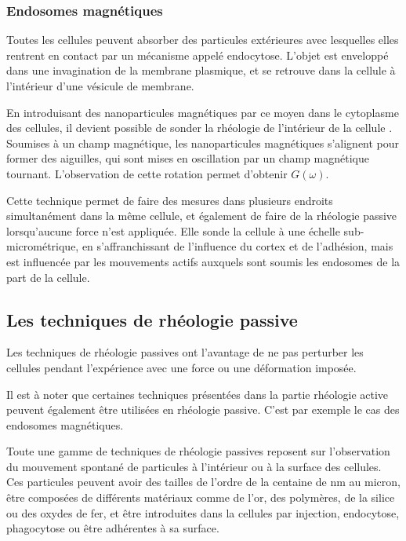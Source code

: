 \subsubsection{Endosomes magnétiques}

Toutes les cellules peuvent absorber des particules extérieures avec lesquelles elles rentrent en contact par un mécanisme appelé endocytose. L'objet est enveloppé dans une invagination de la membrane plasmique, et se retrouve dans la cellule à l'intérieur d'une vésicule de membrane. 

En introduisant des nanoparticules magnétiques par ce moyen dans le cytoplasme des cellules, il devient possible de sonder la rhéologie de l'intérieur de la cellule \parencite{robert_magnetic_2012}. 
Soumises à un champ magnétique, les nanoparticules magnétiques s'alignent pour former des aiguilles, qui sont mises en oscillation par un champ magnétique tournant. 
L'observation de cette rotation permet d'obtenir $G(\omega)$. 

Cette technique permet de faire des mesures dans plusieurs endroits  simultanément dans la même cellule, et également de faire de la rhéologie passive lorsqu'aucune force n'est appliquée. Elle sonde la cellule à une échelle sub-micrométrique, en s'affranchissant de l'influence du cortex et de l'adhésion, mais est influencée par les mouvements actifs auxquels sont soumis les endosomes de la part de la cellule. 

\subsection{Les techniques de rhéologie passive}
Les techniques de rhéologie passives ont l'avantage de ne pas perturber les cellules pendant l'expérience avec une force ou une déformation imposée. 

Il est à noter que certaines techniques présentées dans la partie rhéologie active peuvent également être utilisées en rhéologie passive. C'est par exemple le cas des endosomes magnétiques. 

Toute une gamme de techniques de rhéologie passives reposent sur l'observation du mouvement spontané de particules à l'intérieur ou à la surface des cellules. Ces particules peuvent avoir des tailles de l'ordre de la centaine de nm au micron, être composées de différents matériaux comme de l'or, des polymères, de la silice ou des oxydes de fer, et être introduites dans la cellules par injection, endocytose, phagocytose ou être adhérentes à sa surface. 

